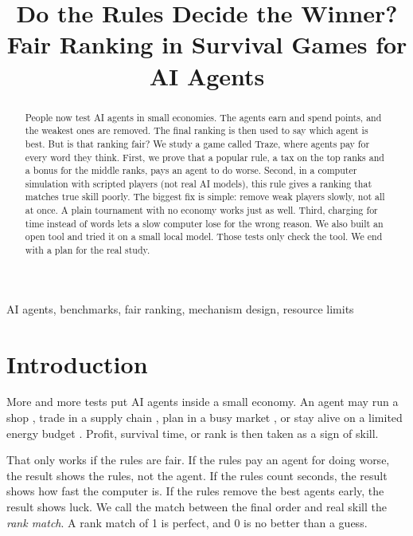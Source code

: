 \documentclass[conference]{IEEEtran}
\theoremstyle{plain}
\newcommand{\todo}[1]{\textcolor{red}{[TODO: #1]}}
\begin{document}
\title{Do the Rules Decide the Winner?\\Fair Ranking in Survival Games for AI Agents}

\author{
\IEEEauthorblockA{Project Traze (open-source research project)\\
\todo{affiliations and contact e-mail}}}

\maketitle

\begin{abstract}
People now test AI agents in small economies. The agents earn and spend points, and the weakest ones are removed. The final ranking is then used to say which agent is best. But is that ranking fair? We study a game called Traze, where agents pay for every word they think. First, we prove that a popular rule, a tax on the top ranks and a bonus for the middle ranks, pays an agent to do worse. Second, in a computer simulation with scripted players (not real AI models), this rule gives a ranking that matches true skill poorly. The biggest fix is simple: remove weak players slowly, not all at once. A plain tournament with no economy works just as well. Third, charging for time instead of words lets a slow computer lose for the wrong reason. We also built an open tool and tried it on a small local model. Those tests only check the tool. We end with a plan for the real study.
\end{abstract}

\begin{IEEEkeywords}
AI agents, benchmarks, fair ranking, mechanism design, resource limits
\end{IEEEkeywords}

\section{Introduction}
More and more tests put AI agents inside a small economy. An agent may run a shop \cite{backlund2025vendingbench}, trade in a supply chain \cite{zheng2026marketbench,sugiura2026coffeebench}, plan in a busy market \cite{hu2026ecogym}, or stay alive on a limited energy budget \cite{hansen2026energy}. Profit, survival time, or rank is then taken as a sign of skill.

That only works if the rules are fair. If the rules pay an agent for doing worse, the result shows the rules, not the agent. If the rules count seconds, the result shows how fast the computer is. If the rules remove the best agents early, the result shows luck. We call the match between the final order and real skill the \emph{rank match}. A rank match of 1 is perfect, and 0 is no better than a guess.
\end{document}
